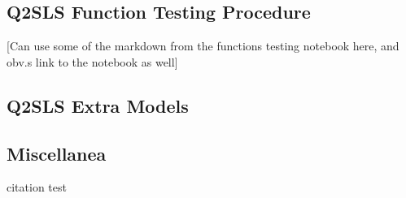 \documentclass[12pt]{article}
\begin{document}
\subsection{Q2SLS Function Testing Procedure}
\textcolor{BrickRed}{[Can use some of the markdown from the functions testing notebook here, and obv.s link to the notebook as well]}

\subsection{Q2SLS Extra Models}

\subsection{Miscellanea}

\newpage
citation test \citep{wooldridge, lasso}%


\nocite{*} %

\end{document}
